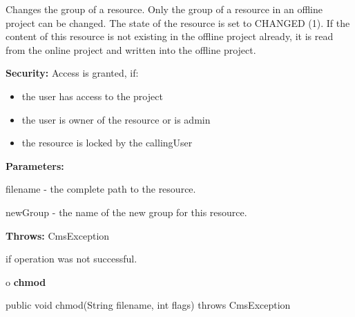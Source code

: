 \begin{description}
\htmlDD Changes the group of a resource. \htmlBR
Only the group of a resource in an offline project can be changed. The state
of the resource is set to CHANGED (1). If the content of this resource is not
existing in the offline project already, it is read from the online project
and written into the offline project.

{\bf Security:} Access is granted, if:

\begin{itemize}
\item the user has access to the project
\item the user is owner of the resource or is admin
\item the resource is locked by the callingUser
\end{itemize}

\begin{description}
\item {\bf Parameters:}

filename - the complete path to the resource.

newGroup - the name of the new group for this resource.
\item {\bf Throws:} CmsException

if operation was not successful.
\end{description}

\end{description}

o {\bf chmod}

\begin{PRE}
 public void chmod(String filename,
                   int flags) throws CmsException
\end{PRE}

